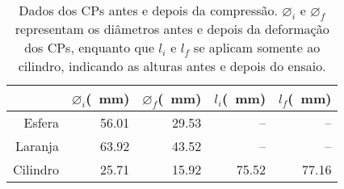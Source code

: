 \begin{table}[H]
\centering
\begin{tabular}{|r|r|r|r|r|}
\hline
 & \multicolumn{1}{c|}{$\varnothing_{i}$(\SI{}{\milli\meter})} & \multicolumn{1}{c|}{$\varnothing_{f}$(\SI{}{\milli\meter})} & \multicolumn{1}{c|}{$l_{i}$(\SI{}{\milli\meter})} & \multicolumn{1}{c|}{$l_{f}$(\SI{}{\milli\meter})} \\ \hline
Esfera & 56.01 & 29.53 & -- & -- \\ \hline
Laranja & 63.92 & 43.52 & -- & -- \\ \hline
Cilindro & 25.71 & 15.92 & 75.52 & 77.16 \\ \hline
\end{tabular}
\caption{Dados dos CPs antes e depois da compressão. $\varnothing_{i}$ e $\varnothing_{f}$ representam os diâmetros antes e depois da deformação dos CPs, enquanto que $l_{i}$ e $l_{f}$ se aplicam somente ao cilindro, indicando as alturas antes e depois do ensaio.}
\label{tab:data}
\end{table}